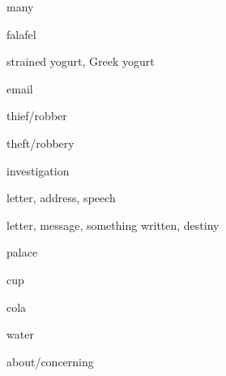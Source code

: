 \begin{flashcard}{\LARGE many}
\LARGE {}
\end{flashcard}
\begin{flashcard}{\LARGE falafel}
\LARGE {}
\end{flashcard}
\begin{flashcard}{\LARGE strained yogurt, Greek yogurt}
\LARGE {}
\end{flashcard}
\begin{flashcard}{\LARGE email}
\LARGE {}
\end{flashcard}
\begin{flashcard}{\LARGE thief/robber}
\LARGE {}
\end{flashcard}
\begin{flashcard}{\LARGE theft/robbery}
\LARGE {}
\end{flashcard}
\begin{flashcard}{\LARGE investigation}
\LARGE {}
\end{flashcard}
\begin{flashcard}{\LARGE letter, address, speech}
\LARGE {}
\end{flashcard}
\begin{flashcard}{\LARGE letter, message, something written, destiny}
\LARGE {}
\end{flashcard}
\begin{flashcard}{\LARGE palace}
\LARGE {}
\end{flashcard}
\begin{flashcard}{\LARGE cup}
\LARGE {}
\end{flashcard}
\begin{flashcard}{\LARGE cola}
\LARGE {}
\end{flashcard}
\begin{flashcard}{\LARGE water}
\LARGE {}
\end{flashcard}
\begin{flashcard}{\LARGE about/concerning}
\LARGE {}
\end{flashcard}
